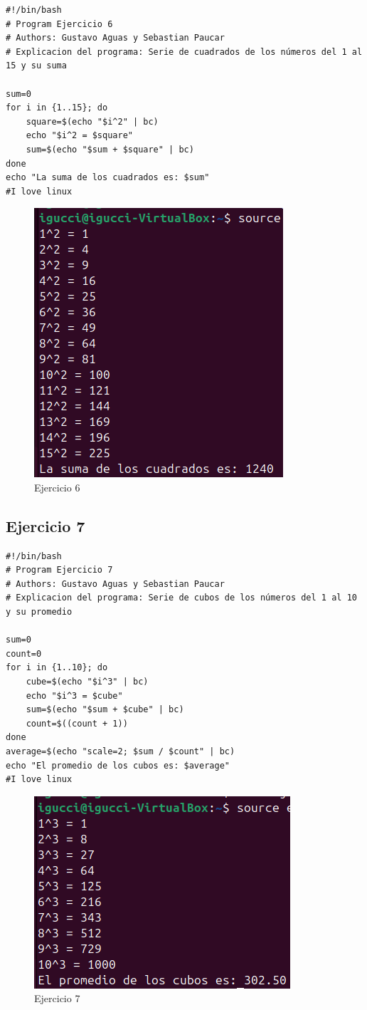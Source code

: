 \documentclass[11pt,twoside]{book}
\begin{document}
\begin{lstlisting}
#!/bin/bash
# Program Ejercicio 6
# Authors: Gustavo Aguas y Sebastian Paucar
# Explicacion del programa: Serie de cuadrados de los números del 1 al 15 y su suma

sum=0
for i in {1..15}; do
    square=$(echo "$i^2" | bc)
    echo "$i^2 = $square"
    sum=$(echo "$sum + $square" | bc)
done
echo "La suma de los cuadrados es: $sum"
#I love linux
\end{lstlisting}
\begin{figure}[h]
    \centering
    \includegraphics[width=0.75\linewidth]{series/ej6.png}
    \caption{Ejercicio 6}
\end{figure}
\newpage
\subsection{Ejercicio 7}
\begin{lstlisting}
#!/bin/bash
# Program Ejercicio 7
# Authors: Gustavo Aguas y Sebastian Paucar
# Explicacion del programa: Serie de cubos de los números del 1 al 10 y su promedio

sum=0
count=0
for i in {1..10}; do
    cube=$(echo "$i^3" | bc)
    echo "$i^3 = $cube"
    sum=$(echo "$sum + $cube" | bc)
    count=$((count + 1))
done
average=$(echo "scale=2; $sum / $count" | bc)
echo "El promedio de los cubos es: $average"
#I love linux
\end{lstlisting}
\begin{figure}[h]
    \centering
    \includegraphics[width=0.6\linewidth]{series/ej7.png}
    \caption{Ejercicio 7}
\end{figure}
\newpage
\end{document}
